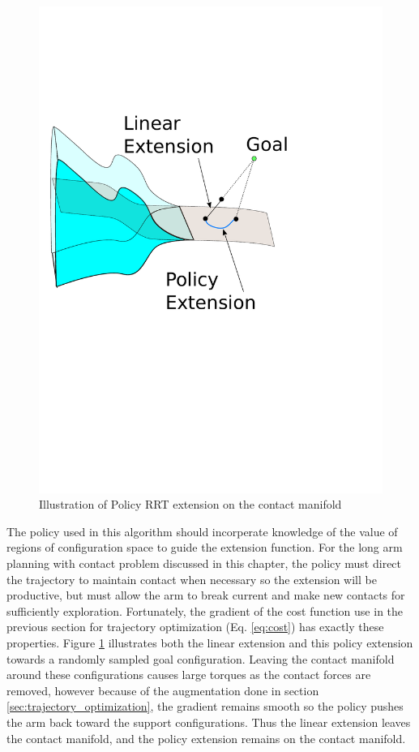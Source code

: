 \documentclass[../thesis.tex]{subfiles}
\begin{document}
\begin{figure}
  \centering
  \includegraphics[width=.5\linewidth]{./Planning/extend.pdf}
  
  \caption{Illustration of Policy RRT extension on the contact manifold}
  \label{fig:extend}
\end{figure}





The policy used in this algorithm should incorperate knowledge of the value of regions of configuration space to guide the extension function.
For the long arm planning with contact problem discussed in this chapter, the policy must direct the trajectory to maintain contact when necessary so the extension will be productive, but must allow the arm to break current and make new contacts for sufficiently exploration.
Fortunately, the gradient of the cost function use in the previous section for trajectory optimization (Eq. \ref{eq:cost}) has exactly these properties.
Figure \ref{fig:extend} illustrates both the linear extension and this policy extension towards a randomly sampled goal configuration.
Leaving the contact manifold around these configurations causes large torques as the contact forces are removed, however because of the augmentation done in section \ref{sec:trajectory_optimization}, the gradient remains smooth so the policy pushes the arm back toward the support configurations.
Thus the linear extension leaves the contact manifold, and the policy extension remains on the contact manifold.
\end{document}
